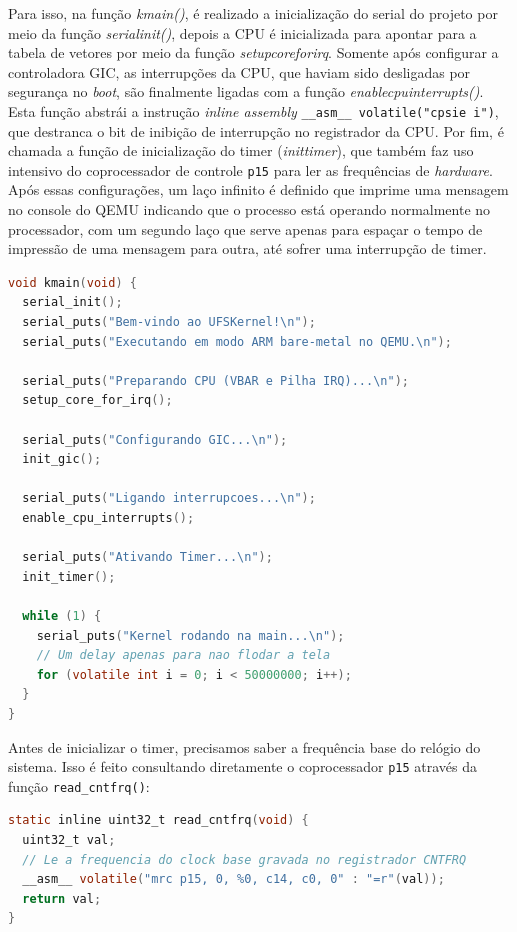 Para isso, na função \emph{kmain()}, é realizado a inicialização do serial do projeto por meio da função \emph{serial\textunderscore{}init()}, depois a CPU é inicializada para apontar para a tabela de vetores por meio da função \emph{setup\textunderscore{}core\textunderscore{}for\textunderscore{}irq}. Somente após configurar a controladora GIC, as interrupções da CPU, que haviam sido desligadas por segurança no \emph{boot}, são finalmente ligadas com a função \emph{enable\textunderscore{}cpu\textunderscore{}interrupts()}. Esta função abstrái a instrução \emph{inline assembly} \texttt{\_\_asm\_\_ volatile("cpsie i")}, que destranca o bit de inibição de interrupção no registrador da CPU. Por fim, é chamada a função de inicialização do timer (\emph{init\textunderscore{}timer}), que também faz uso intensivo do coprocessador de controle \texttt{p15} para ler as frequências de \emph{hardware}. Após essas configurações, um laço infinito é definido que imprime uma mensagem no console do QEMU indicando que o processo está operando normalmente no processador, com um segundo laço que serve apenas para espaçar o tempo de impressão de uma mensagem para outra, até sofrer uma interrupção de timer.
\begin{lstlisting}[language=C]
void kmain(void) {
  serial_init();
  serial_puts("Bem-vindo ao UFSKernel!\n");
  serial_puts("Executando em modo ARM bare-metal no QEMU.\n");

  serial_puts("Preparando CPU (VBAR e Pilha IRQ)...\n");
  setup_core_for_irq();

  serial_puts("Configurando GIC...\n");
  init_gic();

  serial_puts("Ligando interrupcoes...\n");
  enable_cpu_interrupts();

  serial_puts("Ativando Timer...\n");
  init_timer();

  while (1) {
    serial_puts("Kernel rodando na main...\n");
    // Um delay apenas para nao flodar a tela
    for (volatile int i = 0; i < 50000000; i++);
  }
}
\end{lstlisting}

Antes de inicializar o timer, precisamos saber a frequência base do relógio do sistema. Isso é feito consultando diretamente o coprocessador \texttt{p15} através da função \texttt{read\_cntfrq()}:

\begin{lstlisting}[language=C]
static inline uint32_t read_cntfrq(void) {
  uint32_t val;
  // Le a frequencia do clock base gravada no registrador CNTFRQ
  __asm__ volatile("mrc p15, 0, %0, c14, c0, 0" : "=r"(val));
  return val;
}
\end{lstlisting}

